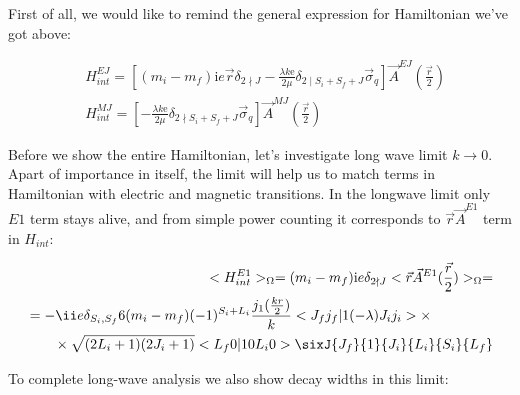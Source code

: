 First of all, we would like to remind the general expression for Hamiltonian we've got above:

\begin{align}
    &H_{int}^{EJ} = \left[(m_i - m_f) \mathrm{i} e \vec{r} \delta_{2 \nmid J} - \frac{\lambda k \mathrm{e}}{2 \mu} \delta_{2 \mid S_i + S_f + J} \vec{\sigma}_{q} \right] \vec{A}^{EJ}(\frac{\vec{r}}{2}) \\
    &H_{int}^{MJ} = \left[ -\frac{\lambda k \mathrm{e}}{2 \mu} \delta_{2 \nmid S_i + S_f + J} \vec{\sigma}_{q} \right] \vec{A}^{MJ}(\frac{\vec{r}}{2})
\end{align}

Before we show the entire Hamiltonian, let's investigate long wave limit $k \rightarrow 0$. Apart of importance in itself, the limit will help us to match terms in Hamiltonian with electric and magnetic transitions. In the longwave limit only $E1$ term stays alive, and from simple power counting it corresponds to $\vec{r}\vec{A}^{E1}$ term in $H_{int}$:

\begin{align}
    \begin{split}
        <H_{int}^{E1}>_{\Omega} = (m_i-m_f)\mathrm{i}e\delta_{2 \nmid J} <\vec{r}\vec{A}^{E1}(\frac{\vec{r}}{2})>_{\Omega} =
    \end{split}\\
    \begin{split}
        &= -\ii e \delta_{S_i, S_f} 6 (m_i-m_f) (-1)^{ S_i + L_i} \frac{j_1(\frac{k r}{2})}{k} <J_f j_f | 1 (-\lambda) J_i j_i> \times \\
        &\qquad\times \sqrt{(2L_i+1)(2J_i+1)} <L_f 0 | 1 0 L_i 0> \sixJ{J_f}{1}{J_i}{L_i}{S_{i}}{L_f}
    \end{split}
\end{align}

To complete long-wave analysis we also show decay widths in this limit:

